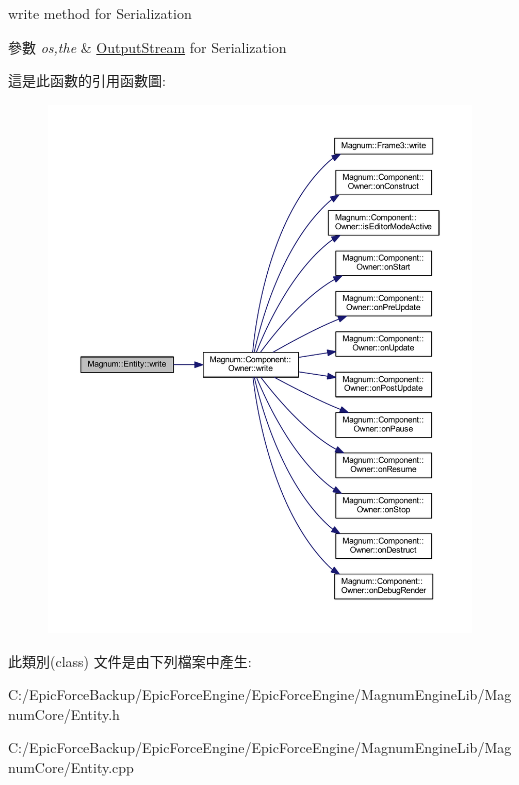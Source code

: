 write method for Serialization 


\begin{DoxyParams}{參數}
{\em os,the} & \hyperlink{class_magnum_1_1_output_stream}{Output\+Stream} for Serialization \\
\hline
\end{DoxyParams}


這是此函數的引用函數圖\+:\nopagebreak
\begin{figure}[H]
\begin{center}
\leavevmode
\includegraphics[width=350pt]{class_magnum_1_1_entity_a10741436b8c23a174df4918577ad593c_cgraph}
\end{center}
\end{figure}




此類別(class) 文件是由下列檔案中產生\+:\begin{DoxyCompactItemize}
\item 
C\+:/\+Epic\+Force\+Backup/\+Epic\+Force\+Engine/\+Epic\+Force\+Engine/\+Magnum\+Engine\+Lib/\+Magnum\+Core/Entity.\+h\item 
C\+:/\+Epic\+Force\+Backup/\+Epic\+Force\+Engine/\+Epic\+Force\+Engine/\+Magnum\+Engine\+Lib/\+Magnum\+Core/Entity.\+cpp\end{DoxyCompactItemize}
